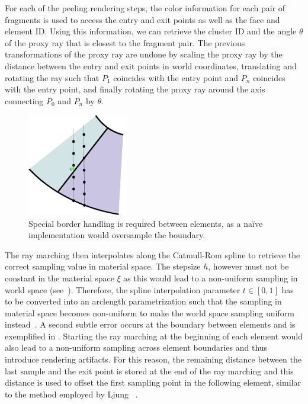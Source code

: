 For each of the peeling rendering steps, the color information for each pair of fragments is used to access the entry and exit points as well as the face and element ID. Using this information, we can retrieve the cluster ID and the angle $\theta$ of the proxy ray that is closest to the fragment pair.  The previous transformations of the proxy ray are undone by scaling the proxy ray by the distance between the entry and exit points in world coordinates, translating and rotating the ray such that $P_1$ coincides with the entry point and $P_n$ coincides with the entry point, and finally rotating the proxy ray around the axis connecting $P_0$ and $P_n$ by $\theta$.

\begin{figure}
\centering
\includegraphics[width=0.39\textwidth]{figures/contributions/fem/overshoot.pdf}
\caption{Special border handling is required between elements, as a na\"{i}ve implementation would oversample the boundary.}
\label{contributions:fem:overshoot}
\end{figure}

The ray marching then interpolates along the Catmull-Rom spline to retrieve the correct sampling value in material space.  The stepsize $h$, however must not be constant in the material space $\xi$ as this would lead to a non-uniform sampling in world space (see~). Therefore, the spline interpolation parameter $t \in [0,1]$ has to be converted into an arclength parametrization such that the sampling in material space becomes non-uniform to make the world space sampling uniform instead~\cite{guenter90arclength}.  A second subtle error occurs at the boundary between elements and is exemplified in .  Starting the ray marching at the beginning of each element would also lead to a non-uniform sampling across element boundaries and thus introduce rendering artifacts.  For this reason, the remaining distance between the last sample and the exit point is stored at the end of the ray marching and this distance is used to offset the first sampling point in the following element, similar to the method employed by Ljung \etal~\cite{ljung2006adaptive}.

